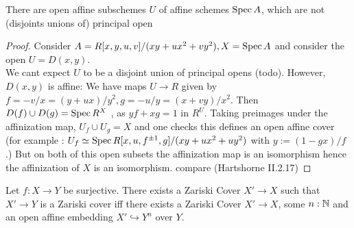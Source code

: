 \documentclass{article}
\begin{document}
\begin{example}
    There are open affine subschemes $U$ of affine schemes $\operatorname{Spec} A$, which are not (disjoints unions of) principal open
\end{example}
\begin{proof}
    Consider $A = R[x,y,u,v]/(xy + ux^2 + vy^2), X= \operatorname{Spec} A$ and consider the open $U = D(x,y)$. \\
    We cant expect $U$ to be a disjoint union of principal opens (todo). However, $D(x,y)$ is affine: We have maps $U \to R$ given by
    $f = -v/x = (y+ux)/y^2 , g= -u/y = (x+vy)/x^2$. 
    Then $D(f) \cup D(g) = \operatorname{Spec} R^X$ , as $yf + xg = 1$ in $R^U$.
    Taking preimages under the affinization map, $U_f \cup U_g = X$ and one checks this defines an open affine cover (for example : $U_f \simeq \operatorname{Spec} R[x,u,f^{\pm 1}, g] / (xy + ux^2 + uy^2)$ with $y := (1-gx)/f$.)
    But on both of this open subsets the affinization map is an isomorphism
    hence the affinization of $X$ is an isomorphism.
    compare (Hartshorne II.2.17)
\end{proof}
    
\begin{lemma}
    Let $f : X \to Y$ be surjective. There exists a Zariski Cover $X' \to X$ such that $X' \to Y$ is a Zariski cover iff there exists a Zariski Cover $X' \to X$, some $n : \mathbb{N}$ and an open affine embedding $X' \hookrightarrow Y^n$ over $Y$.
\end{lemma}
\end{document}

